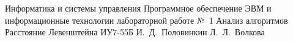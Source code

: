 \makereporttitle
{Информатика и системы управления} %
{Программное обеспечение ЭВМ и информационные технологии} %
{лабораторной работе №~1} %
{Анализ алгоритмов} %
{Расстояние Левенштейна} %
{}
{ИУ7-55Б}
{И.~Д.~Половинкин} %
{Л.~Л.~Волкова}
